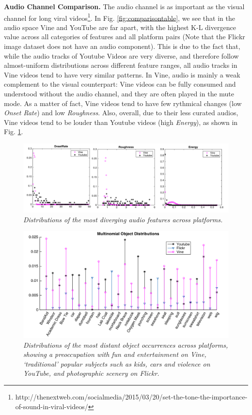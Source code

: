 \noindent\textbf{Audio Channel Comparison.} 
The audio channel is as important as the visual channel for long viral videos\footnote{\scriptsize http://thenextweb.com/socialmedia/2015/03/20/set-the-tone-the-importance-of-sound-in-viral-videos/}. In Fig. \ref{fig:comparisontable}, we see that in the audio space Vine and YouTube are far apart, with the highest K-L divergence value across all categories of features and all platform pairs (Note that the Flickr image dataset does not have an audio component). This is due to the fact that, while the audio tracks of Youtube Videos are very diverse, and therefore follow almost-uniform distributions across different feature ranges, all audio tracks in Vine videos tend to have very similar patterns. In Vine, audio is mainly a weak complement to the visual counterpart: Vine videos can be fully consumed and understood without the audio channel, and they are often played in the mute mode. As a matter of fact, Vine videos tend to have few rythmical changes (low \emph{Onset Rate}) and low \emph{Roughness}. Also, overall, due to their less curated audios, Vine videos tend to be louder than Youtube videos (high \emph{Energy}), as shown in Fig. \ref{fig:comparison_audio}.

\begin{figure}[!htb]
\centering
\includegraphics[width=\columnwidth]{plots/comparison/audio}
\caption{\textsl{ Distributions of the most diverging audio features across platforms.}}
\label{fig:comparison_audio}
\end{figure}

\begin{figure}[!htb]
\centering
\includegraphics[width=\columnwidth]{plots/comparison/objects}
\caption{\textsl{ Distributions of the most distant object occurrences across platforms, showing a preoccupation with fun and entertainment on Vine, `traditional' popular subjects such as kids, cars and violence on YouTube, and photographic scenery on Flickr.}}
\label{fig:comparison_objects}
\end{figure}

